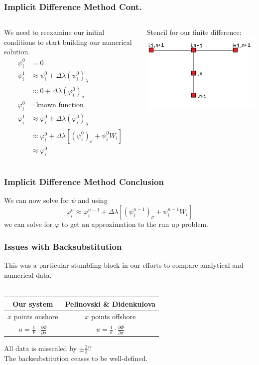 \begin{frame}
\frametitle{Implicit Difference Method Cont.}

\begin{columns}
We need to reexamine our initial conditions to start building our numerical solution.\\
\begin{align*}
\psi^{0}_i&=0\\
\psi_i^1&\approx\psi^0_i+\Delta\lambda (\psi^0_i)_\lambda\\
&\approx0+\Delta\lambda(\varphi^0_i)_\sigma\\
\varphi^0_i&=\text{known function}\\
\varphi^1_i&\approx\varphi^0_i+\Delta\lambda(\varphi^0_i)_\lambda\\
&\approx\varphi^0_i+\Delta\lambda[(\psi^0_i)_\sigma+\psi^0_iW_i]\\
&\approx\varphi^0_i
\end{align*}

\vspace{.2\textheight}
Stencil for our finite difference:\vspace{-5mm}
\includegraphics{Stencil_for_Finite_difference.png}
\end{columns}
\end{frame}

\begin{frame}
\frametitle{Implicit Difference Method Conclusion}
We can now solve for $\psi$ and using
\[
 \varphi^n_i\approx \varphi^{n-1}_i+\Delta\lambda[(\psi^{n-1}_i)_\sigma+\psi^{n-1}_iW_i]
 \]
we can solve for $\varphi$ to get an approximation to the run up problem. 
\end{frame}

\begin{frame}
\frametitle{Issues with Backsubstitution}
This was a particular stumbling block in our efforts to compare analytical and numerical data.\\
\quad\\
\begin{center}
\begin{tabular}{c c}
Our system & Pelinovski \& Didenkulova\\
\hline
$x$ points onshore & $x$ points offshore\\
$u = \frac{1}{F} \cdot \frac{\partial \Phi}{\partial \sigma}$ & $u = \frac{1}{\sigma} \cdot \frac{\partial \Phi}{\partial \sigma}$
\end{tabular}
\end{center}
All data is misscaled by $\pm \frac{2}{3}$!!\\
The backsubstitution ceases to be well-defined.
\end{frame}
